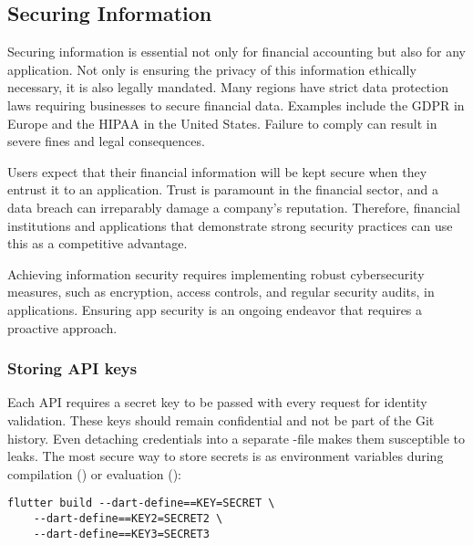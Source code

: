 
\subsection{Securing Information}

Securing information is essential not only for financial accounting but also for any application. Not only is ensuring 
the privacy of this information ethically necessary, it is also legally mandated. Many regions have strict data 
protection laws requiring businesses to secure financial data. Examples include the GDPR in Europe and the HIPAA in the 
United States. Failure to comply can result in severe fines and legal consequences.

Users expect that their financial information will be kept secure when they entrust it to an application. Trust is 
paramount in the financial sector, and a data breach can irreparably damage a company's reputation. Therefore, financial 
institutions and applications that demonstrate strong security practices can use this as a competitive advantage.

Achieving information security requires implementing robust cybersecurity measures, such as encryption, access controls, 
and regular security audits, in applications. Ensuring app security is an ongoing endeavor that requires a proactive 
approach.


\subsubsection{Storing API keys}

Each API requires a secret key to be passed with every request for identity validation. These keys should remain 
confidential and not be part of the Git history. Even detaching credentials into a separate -file makes them 
susceptible to leaks. The most secure way to store secrets is as environment variables during compilation () or 
evaluation ():

\begin{lstlisting}[language=terminal]
flutter build --dart-define==KEY=SECRET \
    --dart-define==KEY2=SECRET2 \
    --dart-define==KEY3=SECRET3
\end{lstlisting}

